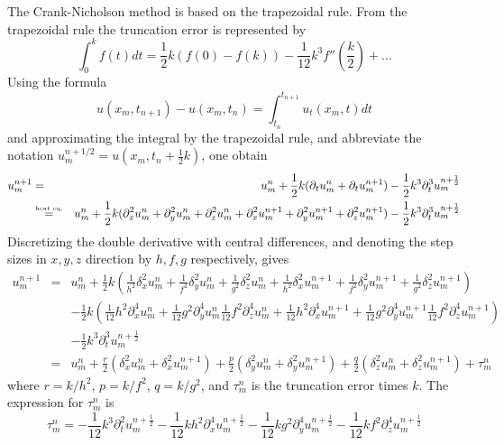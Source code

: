 The Crank-Nicholson method is based on the trapezoidal rule. From the trapezoidal rule the truncation error is represented by
\begin{equation*}
\int_0^k f(t) dt = \frac{1}{2} k (f(0) - f(k)) -\frac{1}{12} k^3 f''(\frac{k}{2}) + ...
\end{equation*}
Using the formula
\begin{equation*}
	u(x_m,t_{n+1}) - u(x_m,t_n) = \int_{t_n} ^{t_{n+1}} u_t(x_m,t) dt
\end{equation*}
and approximating the integral by the trapezoidal rule, and abbreviate the notation $u_m^{n+1/2} = u(x_m,t_n+\frac{1}{2} k)$, one obtain
\begin{eqnarray*}
u_m^ {n+1} &=& u_m^ n + \frac{1}{2} k(\partial_t u_m^n + \partial_t u_m^{n+1}) - \frac{1}{2} k^3 \partial_t ^3 u_m^{n+\frac{1}{2}} \\
		   &\stackrel{\text{\tiny heat eq.}}{=}&  u_m^ n + \frac{1}{2} k(\partial_x^2 u_m^n + \partial_y^2 u_m^n + \partial_z^2 u_m^n + \partial_x^2 u_m^{n+1} + \partial_y^2 u_m^{n+1} + \partial_z^2 u_m^{n+1}) - \frac{1}{2} k^3 \partial_t ^3 u_m^{n+\frac{1}{2}}
\end{eqnarray*}
Discretizing the double derivative with central differences, and denoting the step sizes in $x, y, z$ direction by $h, f, g$ respectively, gives
\begin{eqnarray*}
u_m^{n+1} &=&  u_m^ n + \frac{1}{2} k(\frac{1}{h^2}\delta_x^2 u_m^n + \frac{1}{f^2}\delta_y^2 u_m^n + \frac{1}{g^2}\delta_z^2 u_m^n + \frac{1}{h^2}\delta_x^2 u_m^{n+1} + \frac{1}{f^2}\delta_y^2 u_m^{n+1} + \frac{1}{g^2}\delta_z^2 u_m^{n+1}) \\
 		  &&- \frac{1}{2} k (\frac{1}{12}h^2\partial_x^4 u_m^n + \frac{1}{12}g^2\partial_y^4 u_m^n \frac{1}{12}f^2\partial_z^4 u_m^n + \frac{1}{12}h^2\partial_x^4 u_m^{n+1} + \frac{1}{12}g^2\partial_y^4 u_m^{n+1} \frac{1}{12}f^2\partial_z^4 u_m^{n+1} ) \\
 		  &&- \frac{1}{2} k^3 \partial_t ^3 u_m^{n+\frac{1}{2}} \\
 		  &=& u_m^n + \frac{r}{2}(\delta_x^2 u_m^n + \delta_x^2 u_m^{n+1}) + \frac{p}{2}(\delta_y^2 u_m^n + \delta_y^2 u_m^{n+1}) + \frac{q}{2}(\delta_z^2 u_m^n + \delta_z^2 u_m^{n+1}) + \tau_m^n
\end{eqnarray*}
where $r = k/h^2$, $p = k/f^2$, $q = k/g^2$, and $\tau_m^n$ is the truncation error times $k$. The expression for $\tau_m^n$ is
\begin{equation*}
\tau_m^n = -\frac{1}{12} k^3 \partial_t^2 u_m^{n+\frac{1}{2}} - \frac{1}{12} k h^2 \partial_x^4 u_m^{n+\frac{1}{2}} - \frac{1}{12} k g^2 \partial_y^4 u_m^{n+\frac{1}{2}} - \frac{1}{12} k f^2 \partial_z^4 u_m^{n+\frac{1}{2}}
\end{equation*}
